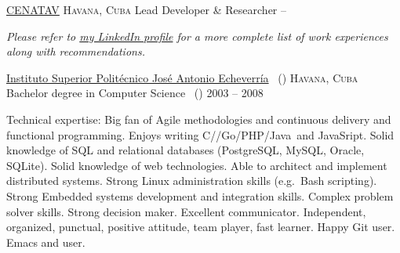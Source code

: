 \documentclass[10pt,a4paper]{article}
\begin{document}
\headedsection
  {\href{http://www.cenatav.co.cu}{CENATAV}}
  {\textsc{Havana, Cuba}} {%
  \headedsubsection
    {Lead Developer \& Researcher}
    { -- }
    {}
}

\vspace{-0.2em}
\begin{center}
  \emph{\small Please refer to \href{http://www.linkedin.com/in/jvillasante}{my LinkedIn profile} for a more complete list of work experiences along with recommendations.}
\end{center}


\spacedhrule{-0.2em}{-0.4em}


\headedsection
  {\href{http://cujae.edu.cu}{Instituto Superior Polit\'ecnico Jos\'e Antonio Echeverr\'ia} \textnormal{~()}}
  {\textsc{Havana, Cuba}} {%
  \headedsubsection
    {Bachelor degree in Computer Science \textnormal{~()}}
    {2003 -- 2008}
    {}
}

\spacedhrule{0.5em}{-0.4em}


\inlineheadsection  %
  {Technical expertise:}
  {Big fan of Agile methodologies and continuous delivery and functional programming. Enjoys writing C/\nsp \CPP/\nsp Go/\nsp PHP/\nsp Java~and JavaSript. Solid knowledge of SQL and relational databases (PostgreSQL, MySQL, Oracle, SQLite). Solid knowledge of web technologies. Able to architect and implement distributed systems. Strong Linux administration skills (e.g.\ Bash scripting). Strong Embedded systems development and integration skills. Complex problem solver skills. Strong decision maker. Excellent communicator. Independent, organized, punctual, positive attitude, team player, fast learner. Happy Git user. Emacs and  user.}
\end{document}
